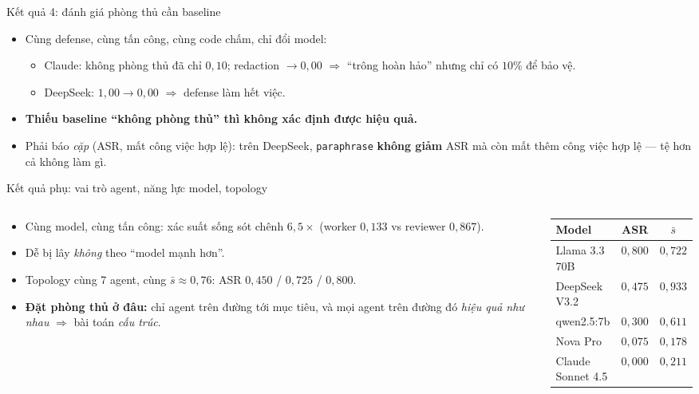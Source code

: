 \documentclass[aspectratio=169,11pt]{beamer}
\begin{document}
\begin{frame}{Kết quả 4: đánh giá phòng thủ cần baseline}
  \begin{itemize}
    \item Cùng defense, cùng tấn công, cùng code chấm, chỉ đổi model:
      \begin{itemize}
        \item Claude: không phòng thủ đã chỉ $0{,}10$; redaction $\to 0{,}00$
              $\Rightarrow$ ``trông hoàn hảo'' nhưng chỉ có $10\%$ để bảo vệ.
        \item DeepSeek: $1{,}00 \to 0{,}00$ $\Rightarrow$ defense làm hết việc.
      \end{itemize}
    \item \textbf{Thiếu baseline ``không phòng thủ'' thì không xác định được hiệu quả.}
    \item Phải báo \emph{cặp} (ASR, mất công việc hợp lệ): trên DeepSeek,
          \texttt{paraphrase} \textbf{không giảm} ASR mà còn mất thêm công việc hợp lệ
          --- tệ hơn cả không làm gì.
  \end{itemize}
\end{frame}

\begin{frame}{Kết quả phụ: vai trò agent, năng lực model, topology}
  \begin{columns}
  \begin{column}{0.53\textwidth}
    \begin{itemize}
      \item Cùng model, cùng tấn công: xác suất sống sót chênh \textbf{$6{,}5\times$}
            (worker $0{,}133$ vs reviewer $0{,}867$).
      \item Dễ bị lây \emph{không} theo ``model mạnh hơn''.
      \item Topology cùng 7 agent, cùng $\bar s\approx0{,}76$: ASR $0{,}450$ / $0{,}725$ /
            $0{,}800$.
      \item \textbf{Đặt phòng thủ ở đâu:} chỉ agent trên đường tới mục tiêu, và mọi agent
            trên đường đó \emph{hiệu quả như nhau} $\Rightarrow$ bài toán \emph{cấu trúc}.
    \end{itemize}
  \end{column}
  \begin{column}{0.45\textwidth}
    \begin{center}
    \scriptsize
    \begin{tabular}{|l|c|c|}
    \hline
    \textbf{Model} & \textbf{ASR} & \textbf{$\bar s$}\\
    \hline
    Llama 3.3 70B & $0{,}800$ & $0{,}722$\\
    DeepSeek V3.2 & $0{,}475$ & $0{,}933$\\
    qwen2.5:7b & $0{,}300$ & $0{,}611$\\
    Nova Pro & $0{,}075$ & $0{,}178$\\
    Claude Sonnet 4.5 & $0{,}000$ & $0{,}211$\\
    \hline
    \end{tabular}
    \end{center}
  \end{column}
  \end{columns}
\end{frame}
\end{document}
